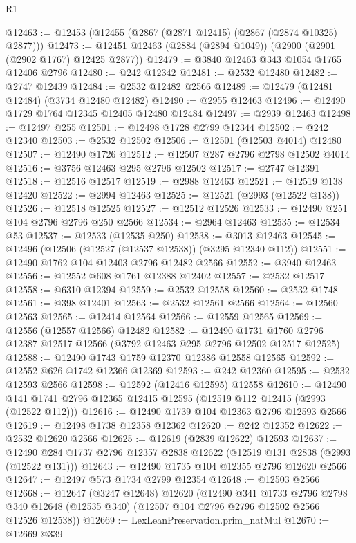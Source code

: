 \begin{lexlean}{R1}
\begin{coremodule}
@12463 := @12453 (@12455 (@2867 (@2871 @12415) (@2867 (@2874 @10325) @2877)))
@12473 := @12451 @12463 (@2884 (@2894 @1049)) (@2900 (@2901 (@2902 @1767) @12425 @2877))
@12479 := @3840 @12463 @343 @1054 @1765 @12406 @2796
@12480 := @242 @12342
@12481 := @2532 @12480
@12482 := @2747 @12439
@12484 := @2532 @12482 @2566
@12489 := @12479 (@12481 @12484) (@3734 @12480 @12482)
@12490 := @2955 @12463
@12496 := @12490 @1729 @1764 @12345 @12405 @12480 @12484
@12497 := @2939 @12463
@12498 := @12497 @255
@12501 := @12498 @1728 @2799 @12344
@12502 := @242 @12340
@12503 := @2532 @12502
@12506 := @12501 (@12503 @4014) @12480
@12507 := @12490 @1726
@12512 := @12507 @287 @2796 @2798 @12502 @4014
@12516 := @3756 @12463 @295 @2796 @12502
@12517 := @2747 @12391
@12518 := @12516 @12517
@12519 := @2988 @12463
@12521 := @12519 @138 @12420
@12522 := @2994 @12463
@12525 := @12521 (@2993 (@12522 @138))
@12526 := @12518 @12525
@12527 := @12512 @12526
@12533 := @12490 @251 @104 @2796 @2796 @250 @2566
@12534 := @2964 @12463
@12535 := @12534 @53
@12537 := @12533 (@12535 @250)
@12538 := @3013 @12463
@12545 := @12496 (@12506 (@12527 (@12537 @12538)) (@3295 @12340 @112))
@12551 := @12490 @1762 @104 @12403 @2796 @12482 @2566
@12552 := @3940 @12463
@12556 := @12552 @608 @1761 @12388 @12402
@12557 := @2532 @12517
@12558 := @6310 @12394
@12559 := @2532 @12558
@12560 := @2532 @1748
@12561 := @398 @12401
@12563 := @2532 @12561 @2566
@12564 := @12560 @12563
@12565 := @12414 @12564
@12566 := @12559 @12565
@12569 := @12556 (@12557 @12566) @12482
@12582 := @12490
    @1731
    @1760
    @2796
    @12387
    @12517
    @12566
    (@3792 @12463 @295 @2796 @12502 @12517 @12525)
@12588 := @12490 @1743 @1759 @12370 @12386 @12558 @12565
@12592 := @12552 @626 @1742 @12366 @12369
@12593 := @242 @12360
@12595 := @2532 @12593 @2566
@12598 := @12592 (@12416 @12595) @12558
@12610 := @12490 @141 @1741 @2796 @12365 @12415 @12595 (@12519 @112 @12415 (@2993 (@12522 @112)))
@12616 := @12490 @1739 @104 @12363 @2796 @12593 @2566
@12619 := @12498 @1738 @12358 @12362
@12620 := @242 @12352
@12622 := @2532 @12620 @2566
@12625 := @12619 (@2839 @12622) @12593
@12637 := @12490 @284 @1737 @2796 @12357 @2838 @12622 (@12519 @131 @2838 (@2993 (@12522 @131)))
@12643 := @12490 @1735 @104 @12355 @2796 @12620 @2566
@12647 := @12497 @573 @1734 @2799 @12354
@12648 := @12503 @2566
@12668 := @12647
    (@3247 @12648)
    @12620
    (@12490
      @341
      @1733
      @2796
      @2798
      @340
      @12648
      (@12535 @340)
      (@12507 @104 @2796 @2796 @12502 @2566 @12526 @12538))
@12669 := LexLeanPreservation.prim_natMul
@12670 := @12669 @339

\end{coremodule}
\end{lexlean}
